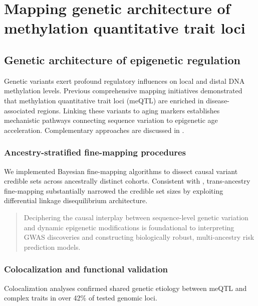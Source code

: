 \chapter{Mapping genetic architecture of methylation quantitative trait loci}

\section{Genetic architecture of epigenetic regulation}

Genetic variants exert profound regulatory influences on local and distal DNA methylation levels. Previous comprehensive mapping initiatives \cite{Smith2024} demonstrated that methylation quantitative trait loci (meQTL) are enriched in disease-associated regions. Linking these variants to aging markers \cite{Horvath2013} establishes mechanistic pathways connecting sequence variation to epigenetic age acceleration. Complementary approaches are discussed in \cite{Cell2020}.

\subsection{Ancestry-stratified fine-mapping procedures}

We implemented Bayesian fine-mapping algorithms to dissect causal variant credible sets across ancestrally distinct cohorts. Consistent with \cite{Pubmed2024}, trans-ancestry fine-mapping substantially narrowed the credible set sizes by exploiting differential linkage disequilibrium architecture.

\begin{quotation}
\begin{singlespace}
  Deciphering the causal interplay between sequence-level genetic variation and dynamic epigenetic modifications is foundational to interpreting GWAS discoveries and constructing biologically robust, multi-ancestry risk prediction models.
\end{singlespace}
\end{quotation}

\subsection{Colocalization and functional validation}

Colocalization analyses confirmed shared genetic etiology between meQTL and complex traits in over 42\% of tested genomic loci.
